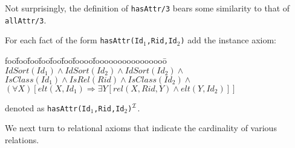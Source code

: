 Not surprisingly, the definition of {\tt hasAttr/3} bears some
similarity to that of {\tt allAttr/3}.

\begin{instance}  \rm 
For each fact of the form {\tt hasAttr(Id$_1$,Rid,Id$_2$)} add the instance
axiom: 
\begin{tabbing}
foo\=foo\=foo\=foo\=foo\=foo\=foooo\=foooooooooooooooo\=\kill
\> $ IdSort(Id_1) \wedge IdSort(Id_2) \wedge IdSort(Id_2) \wedge $ \\
\> \> $ IsClass(Id_1) \wedge IsRel(Rid) \wedge
	 IsClass(Id_2) \wedge $ \\
\> \> \> $ (\forall X) [elt(X,Id_1) \Rightarrow \exists Y [rel(X,Rid,Y) 
					\wedge elt(Y,Id_2)]]$
\end{tabbing}
denoted as {\tt hasAttr(Id$_1$,Rid,Id$_2$)$^{{\cal I}}$}.
\end{instance}

We next turn to relational axioms that indicate the cardinality of
various relations.

